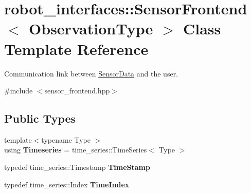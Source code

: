 \hypertarget{classrobot__interfaces_1_1SensorFrontend}{}\section{robot\+\_\+interfaces\+:\+:Sensor\+Frontend$<$ Observation\+Type $>$ Class Template Reference}
\label{classrobot__interfaces_1_1SensorFrontend}


Communication link between \hyperlink{classrobot__interfaces_1_1SensorData}{Sensor\+Data} and the user.  




{\ttfamily \#include $<$sensor\+\_\+frontend.\+hpp$>$}

\subsection*{Public Types}
\begin{DoxyCompactItemize}
\item 
\mbox{\label{classrobot__interfaces_1_1SensorFrontend_a92f23f72c62ac7d32ca10742ddc5019f}} 
{\footnotesize template$<$typename Type $>$ }\\using {\bfseries Timeseries} = time\+\_\+series\+::\+Time\+Series$<$ Type $>$
\item 
\mbox{\label{classrobot__interfaces_1_1SensorFrontend_a28f5b6f4a74b1fd3fcd45fde6df6f0f6}} 
typedef time\+\_\+series\+::\+Timestamp {\bfseries Time\+Stamp}
\item 
\mbox{\label{classrobot__interfaces_1_1SensorFrontend_a199456a7768dfeec4a5c4d2a59461b8d}} 
typedef time\+\_\+series\+::\+Index {\bfseries Time\+Index}
\end{DoxyCompactItemize}
